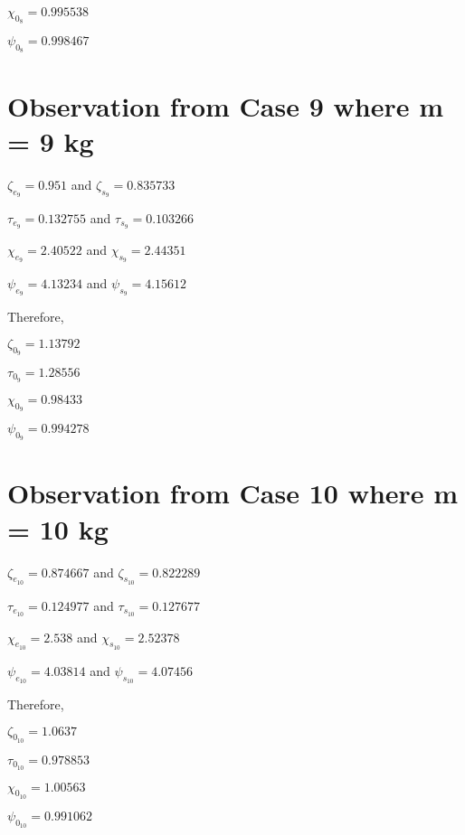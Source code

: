     $\chi_{0_8} = 0.995538$
            
    $\psi_{0_8} = 0.998467$    
            
        
        
\section{{Observation from Case 9 where m = 9 kg}}
        
    {$\zeta_{e_9} = 0.951$ and $\zeta_{s_9} = 0.835733$}
            
    {$\tau_{e_9} = 0.132755$ and $\tau_{s_9} = 0.103266$}
            
    {$\chi_{e_9} = 2.40522$ and $\chi_{s_9} = 2.44351$}
            
    {$\psi_{e_9} = 4.13234$ and $\psi_{s_9} = 4.15612$}
            
    {Therefore,}
            
    $\zeta_{0_9} = 1.13792$
            
    $\tau_{0_9} = 1.28556$
            
    $\chi_{0_9} = 0.98433$
            
    $\psi_{0_9} = 0.994278$    
            
        
        
\section{{Observation from Case 10 where m = 10 kg}}
        
    {$\zeta_{e_{10}} = 0.874667$ and $\zeta_{s_{10}} = 0.822289$}
            
    {$\tau_{e_{10}} = 0.124977$ and $\tau_{s_{10}} = 0.127677$}
            
    {$\chi_{e_{10}} = 2.538$ and $\chi_{s_{10}} = 2.52378$}
            
    {$\psi_{e_{10}} = 4.03814$ and $\psi_{s_{10}} = 4.07456$}
            
    {Therefore,}
            
    $\zeta_{0_{10}} = 1.0637$
            
    $\tau_{0_{10}} = 0.978853$
            
    $\chi_{0_{10}} = 1.00563$
            
    $\psi_{0_{10}} = 0.991062$    
            
        
        




